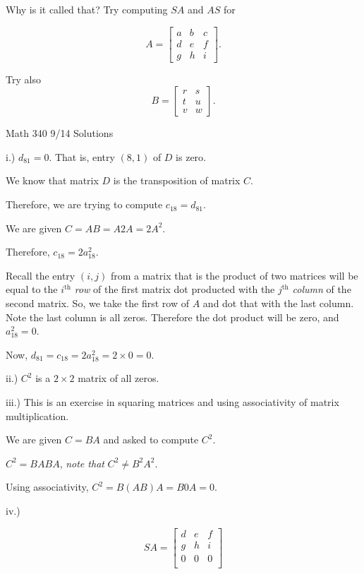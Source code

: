 \documentclass{article}
\begin{document}
Why is it called that? Try computing $SA$ and $AS$ for

$$A = \left[\begin{array}{ccc}
a & b & c\\
d & e & f\\
g & h & i
\end{array}\right].$$

Try also $$B = \left[\begin{array}{ccc}
r & s \\
t & u  \\
v & w 
\end{array}\right].$$

\pagebreak

Math 340 9/14 Solutions

i.) $d_{81}=0$. That is, entry $(8,1)$ of $D$ is zero.

We know that matrix $D$ is the transposition of matrix $C$.

Therefore, we are trying to compute $c_{18}=d_{81}$. 

We are given $C=AB=A2A=2A^2$. 

Therefore, $c_{18}=2a^2_{18}$. 

Recall the entry $(i,j)$ from a matrix that is the product of two matrices will be equal to the $i^{\text{th}}$ \emph{row} of the first matrix dot producted with the $j^{\text{th}}$ \emph{column} of the second matrix. So, we take the first row of $A$ and dot that with the last column. Note the last column is all zeros. Therefore the dot product will be zero, and $a^2_{18}=0$.

Now, $d_{81}=c_{18}=2a^2_{18}=2\times 0 =0$.


\bigskip

ii.) $C^2$ is a $2\times2$ matrix of all zeros. 

\bigskip

iii.) This is an exercise in squaring matrices and using associativity of matrix multiplication. 


We are given $C=BA$ and asked to compute $C^2$. 

$C^2=BABA$, \emph{note that} $C^2\neq B^2A^2$.

Using associativity, $C^2 = B(AB)A = B0A=0$. 

iv.) 

$$SA= \left[\begin{array}{ccc}
d & e & f\\
g & h & i\\
0 & 0 & 0 \\
\end{array}\right]$$
\end{document}
